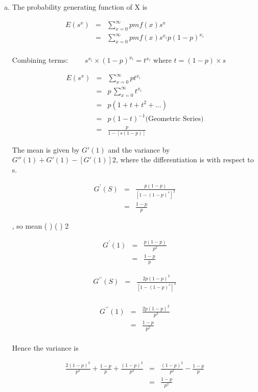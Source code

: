 \documentclass[a4paper,12pt]{article}
\begin{document}
\begin{enumerate}[(a)]
\item The probability generating function of X is

\begin{eqnarray*}
 E(s^x) &=& \sum_{x=0}^{\infty }pmf(x)s^{x}\\
 &=& \sum_{x=0}^{\infty }pmf(x)s^{x_i} p(1-p)^{x_{i}}\\
\end{eqnarray*}

\noindent Combining terms: $\qquad s^{x_i} \times (1-p)^{x_{i}} = t^{x_{i}}$ where $t = (1-p)\times s$

\begin{eqnarray*}
 E(s^x) &=& \sum_{x=0}^{\infty } p t^{x_{i}}\\ 
         &=& p \, \sum_{x=0}^{\infty }  t^{x_{i}}\\
         &=& p(1 + t +t^2 + \ldots)  \\
         &=& p(1-t)^{-1}    \mbox{(Geometric Series)}\\
         &=& \frac{p}{1-[s(1-p)]}
\end{eqnarray*} 

The mean is given by $G'(1)$ and the variance by $G''(1) + G'(1)- [G'(1)]2$, where
the differentiation is with respect to s.

\begin{eqnarray*} 
G^{\prime}(S) 
&=& \frac{p(1-p)}{[1-(1-p)^s]^2} \\
&=& \frac{1-p}{p}
\end{eqnarray*}


, so mean ( ) ( )
2


\begin{eqnarray*} 
G^{\prime}(1) 
&=& \frac{p(1-p)}{p^2} \\
&=& \frac{1-p}{p}
\end{eqnarray*}


\begin{eqnarray*} 
G^{\prime\prime}(S) 
&=& \frac{2p(1-p)^2}{[1-(1-p)^s]^3} \\
\end{eqnarray*}


\begin{eqnarray*} 
G^{\prime\prime}(1) 
&=& \frac{2p(1-p)^2}{p^3} \\
&=& \frac{1-p}{p^2}\\
\end{eqnarray*}

Hence the variance is 

\begin{eqnarray*} 
\frac{2(1-p)^2}{p^2} + \frac{1-p}{p} + \frac{(1-p)^2}{p^2} &=& \frac{(1-p)^2}{p^2} - \frac{1-p}{p} \\
&=& \frac{1-p}{p^2}
\end{eqnarray*}



\end{enumerate}
\end{document}

